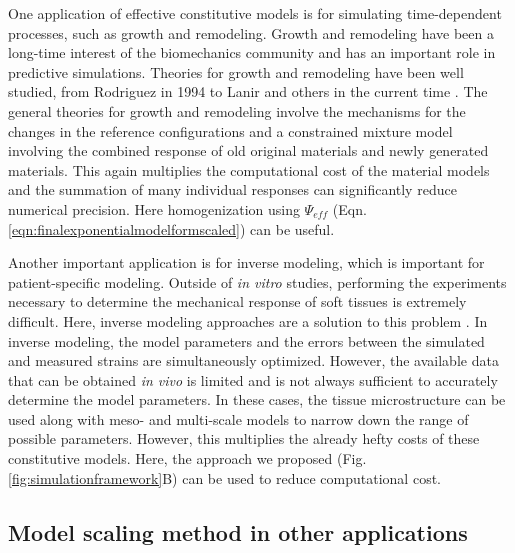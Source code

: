     One application of effective constitutive models is for simulating time-dependent processes, such as growth and remodeling. Growth and remodeling have been a long-time interest of the biomechanics community and has an important role in predictive simulations. Theories for growth and remodeling have been well studied, from Rodriguez in 1994 to Lanir and others in the current time \cite{lanir_mechanistic_2014, gleason_mixture_2004, rodriguez_stress_1994, humphrey_constrained_2002, cowin_tissue_2004, taber_biomechanics_1995}. The general theories for growth and remodeling involve the mechanisms for the changes in the reference configurations and a constrained mixture model involving the combined response of old original materials and newly generated materials. This again multiplies the computational cost of the material models and the summation of many individual responses can significantly reduce numerical precision. Here homogenization using $\Psi_{eff}$ (Eqn. \ref{eqn:finalexponentialmodelformscaled}) can be useful. 
    

    Another important application is for inverse modeling, which is important for patient-specific modeling. Outside of \textit{in vitro} studies, performing the experiments necessary to determine the mechanical response of soft tissues is extremely difficult. Here, inverse modeling approaches are a solution to this problem \cite{lee_inverse_2014, aggarwal_inverse_2015, aggarwal_patient_2013, kim_inverse_2009, liu_inverse_2013}. In inverse modeling, the model parameters and the errors between the simulated and measured strains are simultaneously optimized. However, the available data that can be obtained \textit{in vivo} is limited and is not always sufficient to accurately determine the model parameters. In these cases, the tissue microstructure can be used along with meso- and multi-scale models to narrow down the range of possible parameters. However, this multiplies the already hefty costs of these constitutive models. Here, the approach we proposed (Fig. \ref{fig:simulationframework}B) can be used to reduce computational cost.

 



\subsection{Model scaling method in other applications}
    
